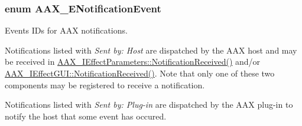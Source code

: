 \subsubsection[{A\+A\+X\+\_\+\+E\+Notification\+Event}]{\setlength{\rightskip}{0pt plus 5cm}enum {\bf A\+A\+X\+\_\+\+E\+Notification\+Event}}\label{a00206_afab5ea2cfd731fc8f163b6caa685406e}


Events I\+Ds for A\+A\+X notifications. 


\begin{DoxyItemize}
\item Notifications listed with {\itshape Sent by\+: Host} are dispatched by the A\+A\+X host and may be received in \hyperlink{a00061_aa3eaeb292d2ca84086a5a058171994fd}{A\+A\+X\+\_\+\+I\+Effect\+Parameters\+::\+Notification\+Received()} and/or \hyperlink{a00060_a11a15162cb3c7019d1fabf2994fba6c6}{A\+A\+X\+\_\+\+I\+Effect\+G\+U\+I\+::\+Notification\+Received()}. Note that only one of these two components may be registered to receive a notification.
\item Notifications listed with {\itshape Sent by\+: Plug-\/in} are dispatched by the A\+A\+X plug-\/in to notify the host that some event has occured.
\end{DoxyItemize}

